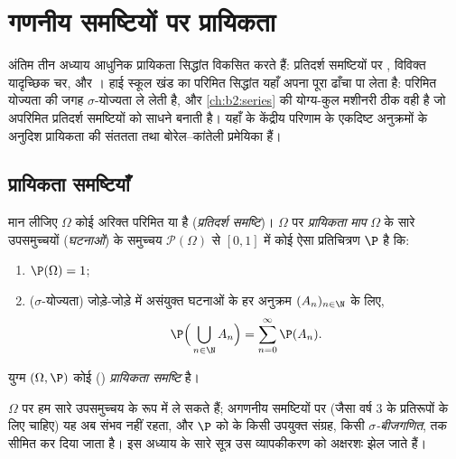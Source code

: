 \chapter{गणनीय समष्टियों पर प्रायिकता}\label{ch:b2:proba}

अंतिम तीन अध्याय आधुनिक प्रायिकता सिद्धांत विकसित करते हैं: 
प्रतिदर्श समष्टियों पर , विविक्त यादृच्छिक चर, और । हाई स्कूल खंड का परिमित सिद्धांत यहाँ अपना पूरा ढाँचा पा लेता
है: परिमित योज्यता की जगह $\sigma$-योज्यता ले लेती है, और \cref{ch:b2:series} की
योग्य-कुल मशीनरी ठीक वही है जो अपरिमित प्रतिदर्श समष्टियों को
साधने  बनाती है। यहाँ के केंद्रीय परिणाम  के एकदिष्ट
अनुक्रमों के अनुदिश प्रायिकता की संततता तथा बोरेल--कांतेली
प्रमेयिका हैं।

\section{प्रायिकता समष्टियाँ}

\begin{definition}\label{def:b2:proba:space}
मान लीजिए $\Omega$ कोई अरिक्त परिमित या  है
(\emph{प्रतिदर्श समष्टि})। $\Omega$ पर
\emph{प्रायिकता माप} $\Omega$ के सारे उपसमुच्चयों
(\emph{घटनाओं}) के समुच्चय $\mathcal{P}(\Omega)$ से $[0, 1]$ में कोई ऐसा
प्रतिचित्रण $\P$ है कि:
\begin{enumerate}
\item $\P(\Omega) = 1$;
\item ($\sigma$-योज्यता) जोड़े-जोड़े में असंयुक्त घटनाओं के हर अनुक्रम
$(A_n)_{n\in\N}$ के लिए,
\[
\P\Bigl(\,\bigcup_{n \in \N} A_n\Bigr)
= \sum_{n=0}^{\infty} \P(A_n) .
\]
\end{enumerate}
युग्म $(\Omega, \P)$ कोई () \emph{प्रायिकता
समष्टि} है।
\end{definition}

\begin{remark}
 $\Omega$ पर हम सारे उपसमुच्चय  के रूप में ले सकते हैं;
अगणनीय समष्टियों पर (जैसा वर्ष 3 के  प्रतिरूपों के लिए चाहिए)
यह अब संभव नहीं रहता, और $\P$ को  के किसी उपयुक्त संग्रह,
किसी \emph{$\sigma$-बीजगणित}, तक सीमित कर दिया जाता है। इस अध्याय के
सारे सूत्र उस व्यापकीकरण को अक्षरशः झेल जाते हैं।
\end{remark}

